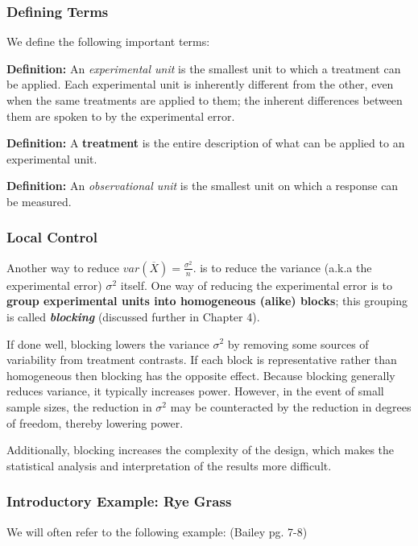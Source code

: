\documentclass[12pt, oneside]{article}
\begin{document}
\subsubsection{Defining Terms}

We define the following important terms:

\textbf{Definition: } An \textit{experimental unit} is the smallest unit to which a treatment can be applied. Each experimental unit is inherently different from the other, even when the same treatments are applied to them; the inherent differences between them are spoken to by the experimental error. 

\textbf{Definition:} A \textbf{treatment} is the entire description of what can be applied to an experimental unit.

\textbf{Definition: } An \textit{observational unit} is the smallest unit on which a response can be measured. 

\subsubsection{Local Control}

Another way to reduce $var (\overline{X}) = \frac{\sigma^{2}}{n}.$ is to reduce the variance (a.k.a the experimental error) $\sigma^{2}$ itself. One way of reducing the experimental error is to \textbf{group experimental units into homogeneous (alike) blocks}; this grouping is called \textit{\textbf{blocking}} (discussed further in Chapter 4). 

If done well, blocking lowers the variance $\sigma^{2}$ by removing some sources of variability from treatment contrasts. If each block is representative rather than homogeneous then blocking has the opposite effect. Because blocking generally reduces variance, it typically increases power. However, in the event of small sample sizes, the reduction in $\sigma^{2}$ may be counteracted by the reduction in degrees of freedom, thereby lowering power. 

Additionally, blocking increases the complexity of the design, which makes the statistical analysis and interpretation of the results more difficult.

\subsubsection{Introductory Example: Rye Grass}

We will often refer to the following example: (Bailey pg. 7-8)
\end{document}

